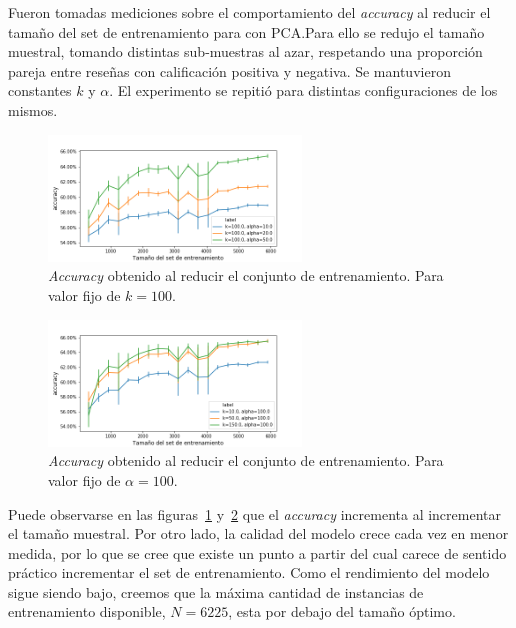% 

%
Fueron tomadas mediciones sobre el comportamiento del \textit{accuracy} al
reducir el tamaño del set de entrenamiento para \knn{} con PCA.\@ Para ello se
redujo el tamaño muestral, tomando distintas sub-muestras al azar, respetando
una proporción pareja entre reseñas con calificación positiva y negativa.
Se mantuvieron constantes $k$ y $\alpha$. El experimento se repitió para
distintas configuraciones de los mismos.

\begin{figure}[ht]
    \centering
    \includegraphics[width=0.6\textwidth]{img/exp_subsampling_k_fijo}
    \caption{\textit{Accuracy} obtenido al reducir el conjunto de
    entrenamiento.  Para valor fijo de $k=100$.}%
    \label{fig:subsampling_k_fijo}
\end{figure}

\begin{figure}[ht]
    \centering
    \includegraphics[width=0.6\textwidth]{img/exp_subsampling_alpha_fijo}
    \caption{\textit{Accuracy} obtenido al reducir el conjunto de
    entrenamiento.  Para valor fijo de $\alpha=100$.}%
    \label{fig:subsampling_alpha_fijo}
\end{figure}

%
Puede observarse en las figuras~\ref{fig:subsampling_k_fijo}
y~\ref{fig:subsampling_alpha_fijo} que el \textit{accuracy} incrementa al
incrementar el tamaño muestral.  Por otro lado, la calidad del modelo crece
cada vez en menor medida, por lo que se cree que existe un punto a partir del
cual carece de sentido práctico incrementar el set de entrenamiento. Como el
rendimiento del modelo sigue siendo bajo, creemos que la máxima cantidad de
instancias de entrenamiento disponible, $N = 6225$, esta por debajo del tamaño
óptimo.

